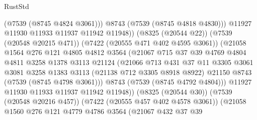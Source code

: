 \begin{lexlean}{RustStd}
\begin{coremodule}
                                  (@7539 (@8745 @4824 @3061)))
                                @8743
                                (@7539 (@8745 @4818 @4830)))
                              @11927
                              @11930
                              @11933
                              @11937
                              @11942
                              @11948))
                          (@8325 (@20544 @22))
                          (@7539 (@20548 @20215 @471))
                          (@7422 (@20555 @471 @402 @4595 @3061))
                          (@21058
                            @1564
                            @276
                            @121
                            @4805
                            @4812
                            @3564
                            (@21067
                              @715
                              @37
                              @39
                              @4769
                              @4804
                              @4811
                              @3258
                              @1378
                              @3113
                              @21124
                              (@21066
                                @713
                                @431
                                @37
                                @11
                                @3305
                                @3061
                                @3081
                                @3258
                                @1383
                                @3113
                                (@21138 @712 @3305 @8918 @8922)
                                @21150
                                @8743
                                (@7539 (@8745 @4798 @3061)))
                              @8743
                              (@7539 (@8745 @4792 @4804)))
                            @11927
                            @11930
                            @11933
                            @11937
                            @11942
                            @11948))
                        (@8325 (@20544 @30))
                        (@7539 (@20548 @20216 @457))
                        (@7422 (@20555 @457 @402 @4578 @3061))
                        (@21058
                          @1560
                          @276
                          @121
                          @4779
                          @4786
                          @3564
                          (@21067
                            @432
                            @37
                            @39

\end{coremodule}
\end{lexlean}
